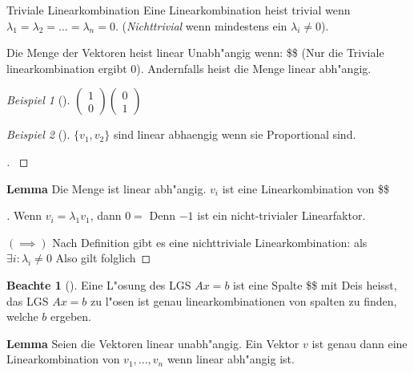 \documentclass[11pt]{article}
\theoremstyle{remark}
\newtheorem{exa}{Beispiel}[section]
\theoremstyle{definition}
\newtheorem*{notte}{Beachte}
\theoremstyle{remark}
\begin{document}
\begin{definition}{Triviale Linearkombination}{}
Eine Linearkombination heist trivial wenn \(\lambda_1 = \lambda_2 = ... =
\lambda_n = 0\). (\emph{Nichttrivial} wenn mindestens ein \(\lambda_i\not= 0\)).
\end{definition}


\begin{definition}{}{}
Die Menge der Vektoren heist linear Unabh"angig wenn: \$\$ (Nur die Triviale
linearkombination ergibt 0). Andernfalls heist die Menge linear abh"angig.
\end{definition}

\begin{exa}[] \label{}
\(\begin{pmatrix}1\\0\end{pmatrix}\begin{pmatrix}0\\1\end{pmatrix}\)
\end{exa}

\begin{exa}[] \label{}
\(\{v_1,v_2\}\) sind linear abhaengig wenn sie Proportional sind.

\begin{proof}[] \label{}

\end{proof}
\end{exa}

\textbf{Lemma} Die Menge ist linear abh"angig. \(v_i\) ist eine Linearkombination von \$\$

\begin{proof}[] \label{}
Wenn \(v_i=\lambda_1 v_1\), dann \(0=\) Denn \(-1\) ist ein nicht-trivialer
Linearfaktor.

\((\implies)\) Nach Definition gibt es eine nichttriviale Linearkombination: als
\(\exists i : \lambda_i \not= 0\) Also gilt  folglich 
\end{proof}

\begin{notte}[] \label{}
Eine L"osung des LGS \(Ax=b\) ist eine Spalte \$\$ mit 
Deis heisst, das LGS \(Ax=b\) zu l"osen ist genau linearkombinationen von spalten
zu finden, welche \(b\) ergeben.
\end{notte}

\textbf{Lemma} Seien die Vektoren linear unabh"angig. Ein Vektor \(v\) ist genau dann
eine Linearkombination von \(v_1,...,v_n\) wenn linear abh"angig ist.
\end{document}
